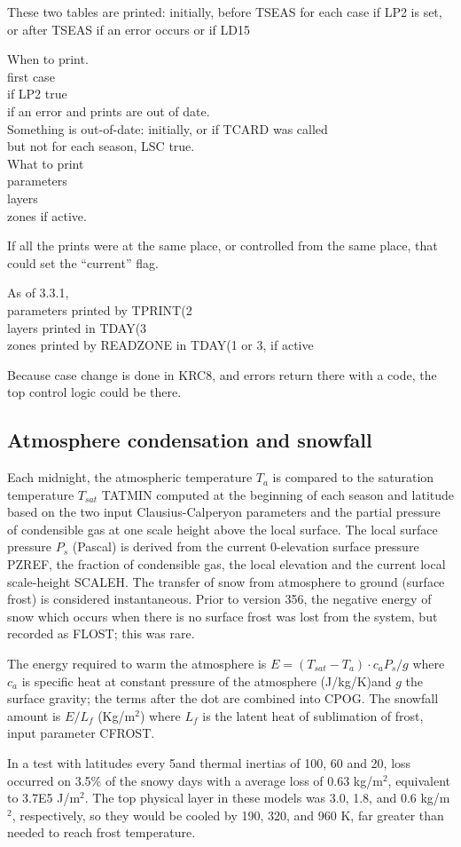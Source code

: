 \documentclass{article}
\newcommand{\qi}{\\ \hspace*{2.em}}      %
\newcommand{\qii}{\\ \hspace*{4.em}}     %
\begin{document}
These two tables are printed: initially, before TSEAS for each case if LP2 is
set, or after TSEAS if an error occurs or if LD15

When to print.
\qi first case
\qi if LP2 true
\qi if an error and prints are out of date.
\qii Something is out-of-date: initially, or if TCARD was called
\qii but not for each season, LSC true.
\\ What to print
\qi parameters
\qi layers
\qi zones if active.

If all the prints were at the same place, or controlled from the same place,
that could set the ``current'' flag.

As of 3.3.1, 
\qi parameters printed by TPRINT(2
\qi layers printed in TDAY(3
\qi zones printed by READZONE in TDAY(1 or 3, if active

Because case change is done in KRC8, and errors return there with a code,
 the top control logic could be there.  

\subsection{Atmosphere condensation and snowfall} %

 Each midnight, the atmospheric temperature $T_a$ is compared to the saturation
 temperature $T_{sat}$ TATMIN computed at the beginning of each season and
 latitude based on the two input Clausius-Calperyon parameters and the partial
 pressure of condensible gas at one scale height above the local surface. The
 local surface pressure $P_s$ (Pascal) is derived from the current 0-elevation
 surface pressure PZREF, the fraction of condensible gas, the local elevation
 and the current local scale-height SCALEH. The transfer of snow from atmosphere
 to ground (surface frost) is considered instantaneous. Prior to version 356,
 the negative energy of snow which occurs when there is no surface frost was lost
 from the system, but recorded as FLOST; this was rare.

 The energy required to warm the atmosphere is $E= (T_{sat}-T_a) \cdot c_a
 P_s/g$ where $c_a$ is specific heat at constant pressure of the atmosphere
 (J/kg/K)and $g$ the surface gravity; the terms after the dot are combined into
 CPOG. The snowfall amount is $E/L_f$ (Kg/m$^2$) where $L_f$ is the latent heat of
 sublimation of frost, input parameter CFROST.

 In a test with latitudes every 5\qd and thermal inertias of 100, 60 and 20,
 loss occurred on 3.5\% of the snowy days with a average loss of 0.63 kg/m$^2$,
 equivalent to 3.7E5 J/m$^2$. The top physical layer in these models was 3.0,
 1.8, and 0.6 kg/m$^2$, respectively, so they would be cooled by 190, 320, and
 960 K, far greater than needed to reach frost temperature.
\end{document}
